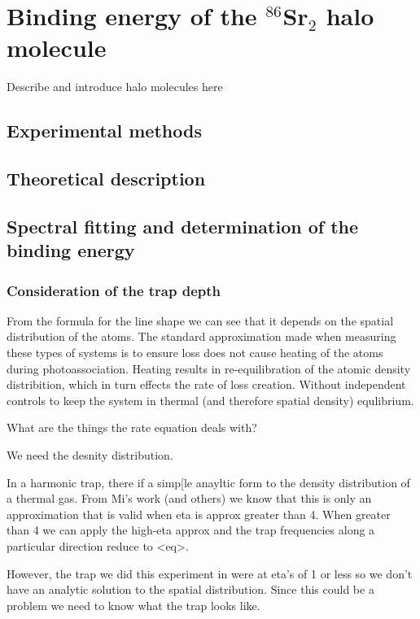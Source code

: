\chapter{Binding energy of the $^{86}$Sr$_2$ halo molecule}
\label{ch:chap4}

Describe and introduce halo molecules here

\section{Experimental methods}
\label{sec:lowE_methods}

\section{Theoretical description}
\label{sec:lowE_theory}

\section{Spectral fitting and determination of the binding energy}
\label{sec:lowE_Eb2}



\subsection{Consideration of the trap depth}
\label{sec:trunc_trap}

From the formula for the line shape we can see that it depends on the spatial distribution of the atoms. The standard approximation made when measuring these types of systems is to ensure loss does not cause heating of the atoms during photoassociation. Heating results in re-equilibration of the atomic density distribition, which in turn effects the rate of loss creation. Without independent controls to keep the system in thermal (and therefore spatial density) equlibrium.

What are the things the rate equation deals with?

We need the desnity distribution.

In a harmonic trap, there if a simp[le anayltic form to the density distribution of a thermal gas. From Mi's work (and others) we know that this is only an approximation that is valid when eta is approx greater than 4. When greater than 4 we can apply the high-eta approx and the trap frequencies along a particular direction reduce to <eq>.

However, the trap we did this experiment in were at eta's of 1 or less so we don't have an analytic solution to the spatial distribution. Since this could be a problem we need to know what the trap looks like.

